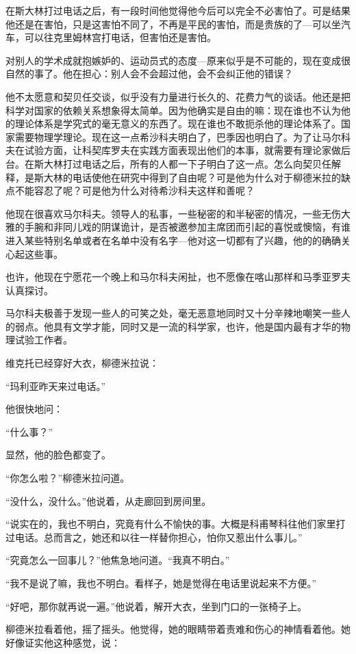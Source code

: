 在斯大林打过电话之后，有一段时间他觉得他今后可以完全不必害怕了。可是结果他还是在害怕，只是这害怕不同了，不再是平民的害怕，而是贵族的了—可以坐汽车，可以往克里姆林宫打电话，但害怕还是害怕。

对别人的学术成就抱嫉妒的、运动员式的态度—原来似乎是不可能的，现在变成很自然的事了。他在担心：别人会不会超过他，会不会纠正他的错误？

他不太愿意和契贝任交谈，似乎没有力量进行长久的、花费力气的谈话。他还是把科学对国家的依赖关系想象得太简单。因为他确实是自由的嘛：现在谁也不认为他的理论体系是学究式的毫无意义的东西了。现在谁也不敢扼杀他的理论体系了。国家需要物理学理论。现在这一点希沙科夫明白了，巴季因也明白了。为了让马尔科夫在试验方面，让科契库罗夫在实践方面表现出他们的本事，就需要有理论家做后台。在斯大林打过电话之后，所有的人都一下子明白了这一点。怎么向契贝任解释，是斯大林的电话使他在研究中得到了自由呢？可是他为什么对于柳德米拉的缺点不能容忍了呢？可是他为什么对待希沙科夫这样和善呢？

他现在很喜欢马尔科夫。领导人的私事，一些秘密的和半秘密的情况，一些无伤大雅的手腕和非同儿戏的阴谋诡计，是否被邀参加主席团而引起的喜悦或懊恼，有谁进入某些特别名单或者在名单中没有名字—他对这一切都有了兴趣，他的的确确关心起这些事。

也许，他现在宁愿花一个晚上和马尔科夫闲扯，也不愿像在喀山那样和马季亚罗夫认真探讨。

马尔科夫极善于发现一些人的可笑之处，毫无恶意地同时又十分辛辣地嘲笑一些人的弱点。他具有文学才能，同时又是一流的科学家，也许，他是国内最有才华的物理试验工作者。

维克托已经穿好大衣，柳德米拉说：

“玛利亚昨天来过电话。”

他很快地问：

“什么事？”

显然，他的脸色都变了。

“你怎么啦？”柳德米拉问道。

“没什么，没什么。”他说着，从走廊回到房间里。

“说实在的，我也不明白，究竟有什么不愉快的事。大概是科甫琴科往他们家里打过电话。总而言之，她还和以往一样替你担心，怕你又惹出什么事儿。”

“究竟怎么一回事儿？”他焦急地问道。“我真不明白。”

“我不是说了嘛，我也不明白。看样子，她是觉得在电话里说起来不方便。”

“好吧，那你就再说一遍。”他说着，解开大衣，坐到门口的一张椅子上。

柳德米拉看着他，摇了摇头。他觉得，她的眼睛带着责难和伤心的神情看着他。她好像证实他这种感觉，说：


